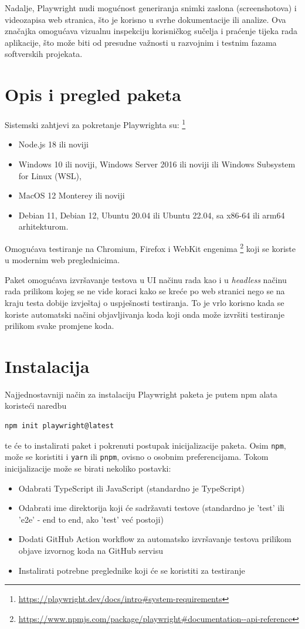 Nadalje, Playwright nudi mogućnost generiranja snimki zaslona (screenshotova) i videozapisa web stranica, što je korisno u svrhe dokumentacije ili analize.
Ova značajka omogućava vizualnu inspekciju korisničkog sučelja i praćenje tijeka rada aplikacije, što može biti od presudne važnosti u razvojnim i testnim fazama softverskih projekata.

    
\section{Opis i pregled paketa}
Sistemski zahtjevi za pokretanje Playwrighta su: \footnote{\url{https://playwright.dev/docs/intro\#system-requirements}}
\begin{itemize}
    \item Node.js 18 ili noviji
    \item Windows 10 ili noviji, Windows Server 2016 ili noviji ili Windows Subsystem for Linux (WSL),
    \item MacOS 12 Monterey ili noviji
    \item Debian 11, Debian 12, Ubuntu 20.04 ili Ubuntu 22.04, sa x86-64 ili arm64 arhitekturom.
\end{itemize}

Omogućava testiranje na Chromium, Firefox i WebKit engenima \footnote{\url{https://www.npmjs.com/package/playwright\#documentation--api-reference}} koji se koriste u modernim web preglednicima.

Paket omogućava izvršavanje testova u UI načinu rada kao i u \emph{headless} načinu rada prilikom kojeg se ne vide koraci kako se kreće po web stranici nego se na kraju testa dobije izvještaj o uspješnosti testiranja.
To je vrlo korisno kada se koriste automatski načini objavljivanja koda koji onda može izvršiti testiranje prilikom svake promjene koda.

\section{Instalacija}

Najjednostavniji način za instalaciju Playwright paketa je putem npm alata koristeći naredbu
\begin{verbatim}
npm init playwright@latest
\end{verbatim}
te će to instalirati paket i pokrenuti postupak inicijalizacije paketa.
Osim \texttt{npm}, može se koristiti i \texttt{yarn} ili \texttt{pnpm}, ovisno o osobnim preferencijama.
Tokom inicijalizacije može se birati nekoliko postavki:
\begin{itemize}
    \item Odabrati TypeScript ili JavaScript (standardno je TypeScript)
    \item Odabrati ime direktorija koji će sadržavati testove (standardno je 'test' ili 'e2e' - end to end, ako 'test' već postoji)
    \item Dodati GitHub Action workflow za automatsko izvršavanje testova prilikom objave izvornog koda na GitHub servisu
    \item Instalirati potrebne preglednike koji će se koristiti za testiranje
    
\end{itemize}

